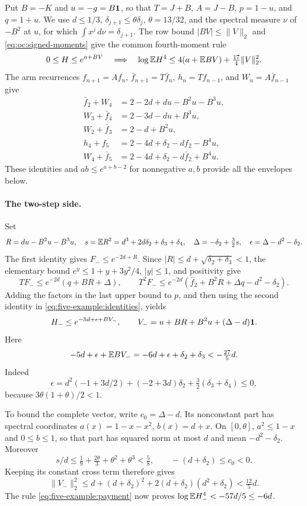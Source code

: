 Put \(B=-K\) and \(u=-g=B\mathbf1\), so that \(T=J+B\),
\(A=J-B\), \(p=1-u\), and \(q=1+u\). We use
\(d\le1/3\), \(\delta_{j+1}\le\theta\delta_j\),
\(\theta=13/32\), and the spectral measure \(\nu\) of \(-B^2\)
at \(u\), for which \(\int x^j\,d\nu=\delta_{j+1}\).
The row bound \(|BV|\le\|V\|_2\) and
\eqref{eq:oc:signed-moments} give the common fourth-moment rule
\begin{equation}\label{eq:five-example:payment}
 0\le H\le e^{a+BV}\quad\Longrightarrow\quad
 \log\mathbb E H^4\le4(a+\mathbb E BV)+\tfrac{17}{4}\|V\|_2^2.
\end{equation}
The arm recurrences \(f_{n+1}=Af_n\),
\(\bar f_{n+1}=T\bar f_n\), \(h_n=Tf_{n-1}\), and
\(W_n=A\bar f_{n-1}\) give
\begin{equation}\label{eq:five-example:identities}
\begin{aligned}
 \bar f_2+W_4&=2-2d+du-B^2u-B^3u,\\
 W_3+\bar f_4&=2-3d-du+B^3u,\\
 W_2+\bar f_3&=2-d+B^2u,\\
 h_4+f_5&=2-4d+\delta_2-df_2-B^4u,\\
 W_4+\bar f_5&=2-4d+\delta_2-d\bar f_2+B^4u.
\end{aligned}
\end{equation}
These identities and \(ab\le e^{a+b-2}\) for nonnegative \(a,b\)
provide all the envelopes below.

\paragraph{The two-step side.}
Set
\[
 R=du-B^2u-B^3u,\quad s=\mathbb E R^2
   =d^3+2d\delta_2+\delta_3+\delta_4,\quad
 \Delta=-\delta_2+\tfrac32s,
 \quad\epsilon=\Delta-d^2-\delta_2.
\]
The first identity gives \(F_-\le e^{-2d+R}\).
Since \(|R|\le d+\sqrt{\delta_2+\delta_3}<1\), the elementary
bound \(e^y\le1+y+3y^2/4\), \(|y|\le1\), and positivity give
\[
 TF_-\le e^{-2d}(q+BR+\Delta),\qquad
 T^2F_-\le e^{-2d}(\bar f_2+B^2R+\Delta q-d^2-\delta_2).
\]
Adding the factors in the last upper bound to \(p\), and then using
the second identity in \eqref{eq:five-example:identities}, yields
\[
 H_-\le e^{-5d+\epsilon+BV_-},\qquad
 V_-=u+BR+B^2u+(\Delta-d)\mathbf1.
\]
Here
\[
 -5d+\epsilon+\mathbb E BV_-
 =-6d+\epsilon+\delta_2+\delta_3<-\tfrac{27}{5}d.
\]
Indeed
\[
 \epsilon=d^2(-1+3d/2)+(-2+3d)\delta_2
                     +\tfrac32(\delta_3+\delta_4)\le0,
\]
because \(3\theta(1+\theta)/2<1\).

To bound the complete vector, write \(c_0=\Delta-d\). Its
nonconstant part has spectral coordinates
\(a(x)=1-x-x^2\), \(b(x)=d+x\).
On \([0,\theta]\), \(a^2\le1-x\) and \(0\le b\le1\),
so that part has squared norm at most \(d\) and mean
\(-d^2-\delta_2\). Moreover
\[
 s/d\le\tfrac19+\tfrac{2\theta}{3}+\theta^2+\theta^3<\tfrac58,
 \qquad -(d+\delta_2)\le c_0<0.
\]
Keeping its constant cross term therefore gives
\[
 \|V_-\|_2^2\le d+(d+\delta_2)^2
                +2(d+\delta_2)(d^2+\delta_2)<\tfrac{12}{5}d.
\]
The rule \eqref{eq:five-example:payment} now proves
\(\log\mathbb E H_-^4<-57d/5\le-6d\).

